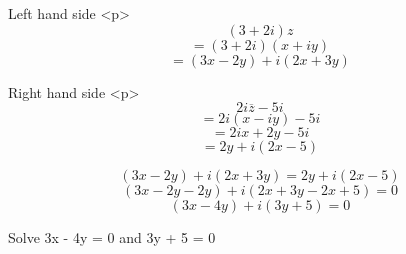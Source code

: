 Left hand side
<p>
$$(3+2i)z$$
$$= (3+2i)(x + iy)$$
$$= (3x-2y)+i(2x+3y)$$

Right hand side
<p>
$$2i\overline{z}-5i$$
$$= 2i(x-iy)-5i$$
$$= 2ix+2y-5i$$
$$= 2y + i(2x-5)$$


$$(3x-2y)+i(2x+3y) = 2y + i(2x-5)$$
$$(3x-2y-2y)+i(2x+3y-2x+5) = 0$$
$$(3x-4y)+i(3y+5) = 0$$

Solve 3x - 4y = 0 and 3y + 5 = 0


